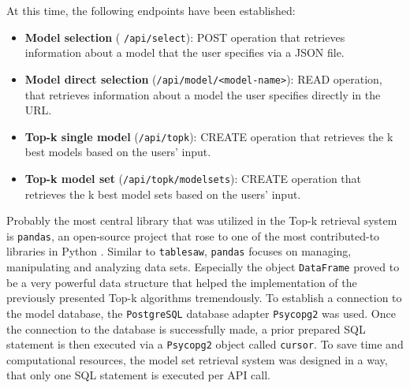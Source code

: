 At this time, the following endpoints have been established:


\begin{itemize}

\item \textbf{Model selection} ( \texttt{/api/select}): POST operation that retrieves information about a model that the user specifies via a JSON file. 
\item \textbf{Model direct selection} (\texttt{/api/model/<model-name>}): READ operation, that retrieves information about a model the user specifies directly in the URL.
\item \textbf{Top-k single model} (\texttt{/api/topk}): CREATE operation that retrieves the k best models based on the users' input.
\item \textbf{Top-k model set} (\texttt{/api/topk/modelsets}): CREATE operation that retrieves the k best model sets based on the users' input.
\end{itemize}



Probably the most central library that was utilized in the Top-k retrieval system is \texttt{pandas}, an open-source project that rose to one of the most contributed-to libraries in Python \cite{mckinney2022}. Similar to \texttt{tablesaw}, \texttt{pandas} focuses on managing, manipulating and analyzing data sets. Especially the object \texttt{DataFrame} proved to be a very powerful data structure that helped the implementation of the previously presented Top-k algorithms tremendously. To establish a connection to the model database, the \texttt{PostgreSQL} database adapter \texttt{Psycopg2} was used. Once the connection to the database is successfully made, a prior prepared SQL statement is then executed via a \texttt{Psycopg2} object called \texttt{cursor}. To save time and computational resources, the model set retrieval system was designed in a way, that only one SQL statement is executed per API call. 

